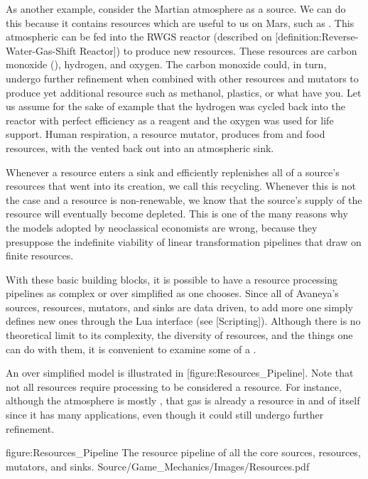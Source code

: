 As another example, consider the Martian atmosphere as a source. We can do this because it contains resources which are useful to us on Mars, such as . This atmospheric  can be fed into the RWGS reactor (described on [definition:Reverse-Water-Gas-Shift Reactor]) to produce new resources. These resources are carbon monoxide (), hydrogen, and oxygen. The carbon monoxide could, in turn, undergo further refinement when combined with other resources and mutators to produce yet additional resource such as methanol, plastics, or what have you. Let us assume for the sake of example that the hydrogen was cycled back into the reactor with perfect efficiency as a reagent and the oxygen was used for life support. Human respiration, a resource mutator, produces  from  and food resources, with the  vented back out into an atmospheric sink.

Whenever a resource enters a sink and efficiently replenishes all of a source's resources that went into its creation, we call this recycling. Whenever this is not the case and a resource is non-renewable, we know that the source's supply of the resource will eventually become depleted. This is one of the many reasons why the models adopted by neoclassical economists are wrong, because they presuppose the indefinite viability of linear transformation pipelines that draw on finite resources.

With these basic building blocks, it is possible to have a resource processing pipelines as complex or over simplified as one chooses. Since all of Avaneya's sources, resources, mutators, and sinks are data driven, to add more one simply defines new ones through the Lua interface (see [Scripting]). Although there is no theoretical limit to its complexity, the diversity of resources, and the things one can do with them, it is convenient to examine some of a .

An over simplified model is illustrated in [figure:Resources_Pipeline]. Note that not all resources require processing to be considered a resource. For instance, although the atmosphere is mostly , that gas is already a resource in and of itself since it has many applications, even though it could still undergo further refinement.

\FullPageDiagram
    {figure:Resources_Pipeline}
    {The resource pipeline of all the core sources, resources, mutators, and sinks.}
    {Source/Game_Mechanics/Images/Resources.pdf}

